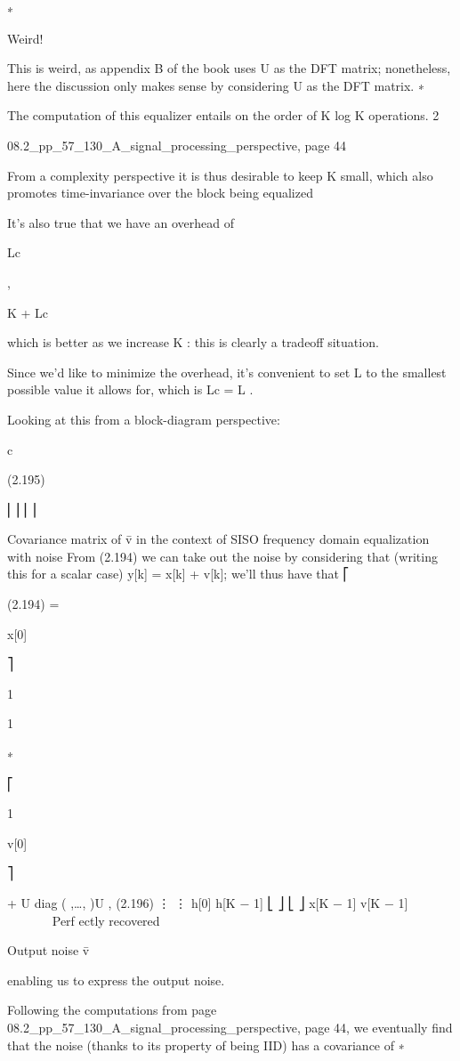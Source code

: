 {{∗

​Weird!

This is weird, as appendix B of the book uses U as the DFT matrix; nonetheless,
here the discussion only makes sense by considering U as the DFT matrix.
∗

The computation of this equalizer entails on the order of K log K operations.
2

08.2_pp_57_130_A_signal_processing_perspective, page 44

From a complexity perspective it is thus desirable to keep K small, which also promotes time-invariance over the block being equalized

It's also true that we have an overhead of

Lc

,

K + Lc

which is better as we increase K : this is clearly a tradeoff situation.

Since we'd like to minimize the overhead, it's convenient to set L to the smallest possible value it allows for, which is Lc = L .

Looking at this from a block-diagram perspective:

c

(2.195)

⎢⎥ ⎢⎥

Covariance matrix of v̄ in the context of SISO frequency domain equalization with noise From (2.194) we can take out the noise by considering that (writing this for a scalar case) y[k] = \sqrtGh[k]x[k] + v[k]; we'll thus have that
⎡

(2.194) =

x[0]

⎤

1

1

∗

⎡

1

v[0]

⎤

+
U diag (
,…,
)U
,
(2.196)
⋮
⋮
h[0]
h[K − 1]
\sqrtG
⎣
⎦
⎣
⎦
x[K − 1]
v[K − 1]










Perf ectly recovered

Output noise v̄

enabling us to express the output noise.

Following the computations from page 08.2_pp_57_130_A_signal_processing_perspective,
page 44, we eventually find that the noise (thanks to its property of being IID) has a covariance of
∗

}}
